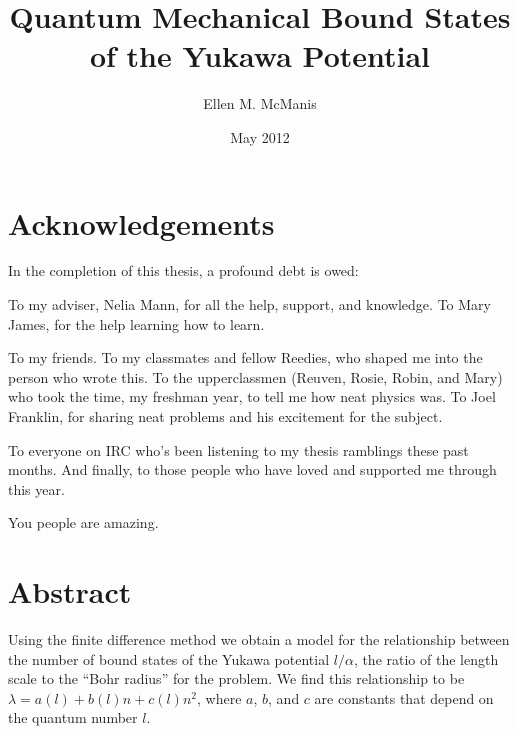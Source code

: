 \documentclass[12pt,twoside]{reedthesis}
\title{Quantum Mechanical Bound States of the Yukawa Potential}
\author{Ellen M. McManis}
\date{May 2012}
\begin{document}
  \maketitle
  \frontmatter %
  \pagestyle{empty} %

    \chapter*{Acknowledgements}
In the completion of this thesis, a profound debt is owed:

To my adviser, Nelia Mann, for all the help, support, and knowledge. To Mary James, for the help learning how to learn.

To my friends. To my classmates and fellow Reedies, who shaped me into the person who wrote this. To the upperclassmen (Reuven, Rosie, Robin, and Mary) who took the time, my freshman year, to tell me how neat physics was. To Joel Franklin, for sharing neat problems and his excitement for the subject. 

To everyone on IRC who's been listening to my thesis ramblings these past months. And finally, to those people who have loved and supported me through this year.

You people are amazing.

    \tableofcontents
    \listoftables
    \listoffigures

    \chapter*{Abstract}
Using the finite difference method we obtain a model for the relationship between the number of bound states of the Yukawa potential $l/\alpha$, the ratio of the length scale to the ``Bohr radius'' for the problem. We find this relationship to be $\lambda = a(l) + b(l)n + c(l)n^2$, where $a$, $b$, and $c$ are constants that depend on the quantum number $l$. 
\end{document}
